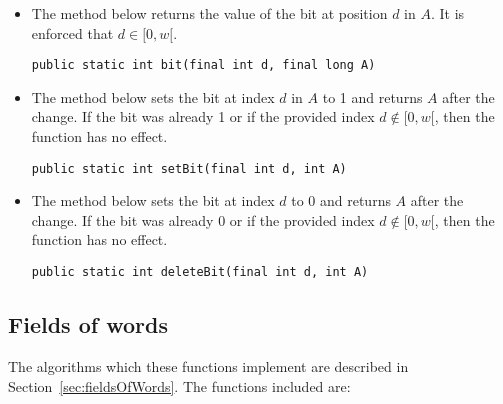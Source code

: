 \begin{itemize}
    \item
    The method below returns the value of the bit at position $d$ in $A$. It is enforced that $d \in [0, w[$.
    \begin{lstlisting}
public static int bit(final int d, final long A)
    \end{lstlisting}
    
    \item
    The method below sets the bit at index $d$ in $A$ to 1 and returns $A$ after the change. If the bit was already 1 or if the provided index $d \not\in [0, w[$, then the function has no effect.
    \begin{lstlisting}
public static int setBit(final int d, int A)
    \end{lstlisting}
    
    \item
    The method below sets the bit at index $d$ to 0 and returns $A$ after the change. If the bit was already 0 or if the provided index $d \not\in [0, w[$, then the function has no effect.
    \begin{lstlisting}
public static int deleteBit(final int d, int A)
    \end{lstlisting}
\end{itemize}

\subsection{Fields of words}
The algorithms which these functions implement are described in Section~\ref{sec:fieldsOfWords}.
The functions included are:

